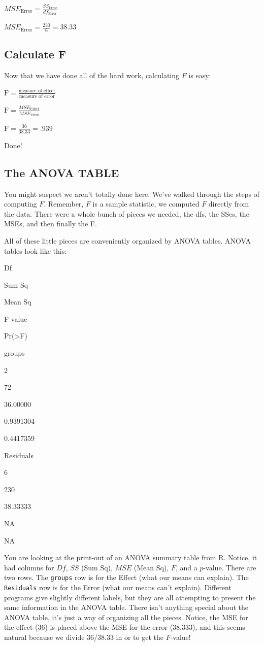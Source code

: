 \documentclass[]{book}
\begin{document}
\(MSE_\text{Error} = \frac{SS_\text{Error}}{df_\text{Error}}\)

\(MSE_\text{Error} = \frac{230}{6} = 38.33\)

\hypertarget{calculate-f}{%
\subsection{Calculate F}\label{calculate-f}}

Now that we have done all of the hard work, calculating \(F\) is easy:

\(\text{F} = \frac{\text{measure of effect}}{\text{measure of error}}\)

\(\text{F} = \frac{MSE_\text{Effect}}{MSE_\text{Error}}\)

\(\text{F} = \frac{36}{38.33} = .939\)

Done!

\hypertarget{the-anova-table}{%
\subsection{The ANOVA TABLE}\label{the-anova-table}}

You might suspect we aren't totally done here. We've walked through the steps of computing \(F\). Remember, \(F\) is a sample statistic, we computed \(F\) directly from the data. There were a whole bunch of pieces we needed, the dfs, the SSes, the MSEs, and then finally the F.

All of these little pieces are conveniently organized by ANOVA tables. ANOVA tables look like this:

Df

Sum Sq

Mean Sq

F value

Pr(\textgreater{}F)

groups

2

72

36.00000

0.9391304

0.4417359

Residuals

6

230

38.33333

NA

NA

You are looking at the print-out of an ANOVA summary table from R. Notice, it had columns for \(Df\), \(SS\) (Sum Sq), \(MSE\) (Mean Sq), \(F\), and a \(p\)-value. There are two rows. The \texttt{groups} row is for the Effect (what our means can explain). The \texttt{Residuals} row is for the Error (what our means can't explain). Different programs give slightly different labels, but they are all attempting to present the same information in the ANOVA table. There isn't anything special about the ANOVA table, it's just a way of organizing all the pieces. Notice, the MSE for the effect (36) is placed above the MSE for the error (38.333), and this seems natural because we divide 36/38.33 in or to get the \(F\)-value!
\end{document}
